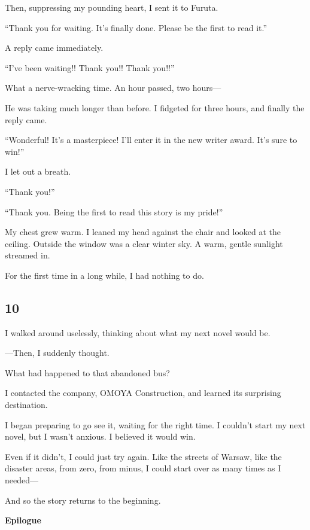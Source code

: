 \documentclass[
    a4paper,
    12pt,
    twoside,
    openany,
    UTF8,
    fontset=windows
]{ctexbook}
\begin{document}
Then, suppressing my pounding heart, I sent it to Furuta.

``Thank you for waiting. It's finally done. Please be the first to read it.''

A reply came immediately.

``I've been waiting!! Thank you!! Thank you!!''

What a nerve-wracking time. An hour passed, two hours---

He was taking much longer than before. I fidgeted for three hours, and finally the reply came.

``Wonderful! It's a masterpiece! I'll enter it in the new writer award. It's sure to win!''

I let out a breath.

``Thank you!''

``Thank you. Being the first to read this story is my pride!''

My chest grew warm. I leaned my head against the chair and looked at the ceiling. Outside the window was a clear winter sky. A warm, gentle sunlight streamed in.

For the first time in a long while, I had nothing to do.


\subsection*{10}

I walked around uselessly, thinking about what my next novel would be.

---Then, I suddenly thought.

What had happened to that abandoned bus?

I contacted the company, OMOYA Construction, and learned its surprising destination.

I began preparing to go see it, waiting for the right time. I couldn't start my next novel, but I wasn't anxious. I believed it would win.

Even if it didn't, I could just try again. Like the streets of Warsaw, like the disaster areas, from zero, from minus, I could start over as many times as I needed---

And so the story returns to the beginning.

\clearpage
\thispagestyle{plain}
\begin{center}
    \large\bfseries Epilogue
\end{center}
\label{sec:epilogue}
\vspace{1cm}
\end{document}
